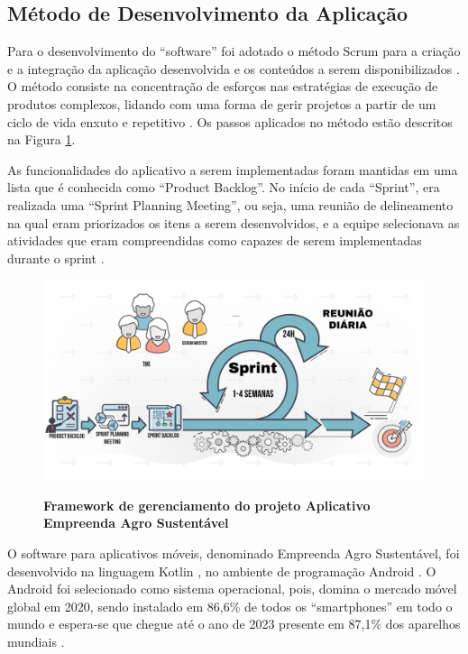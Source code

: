 \subsection{Método de Desenvolvimento da Aplicação}

Para o desenvolvimento do “software” foi adotado o método Scrum para a criação e a integração da aplicação desenvolvida e os conteúdos a serem disponibilizados \cite{schwalbe_scrum_2017}. O método consiste na concentração de esforços nas estratégias de execução de produtos complexos, lidando com uma forma de gerir projetos a partir de um ciclo de vida enxuto e repetitivo \cite{bernardo_framework_2019}. Os passos aplicados no método estão descritos na Figura \ref{figura_47}.

As funcionalidades do aplicativo a serem implementadas foram mantidas em uma lista que é conhecida como “Product Backlog”. No início de cada “Sprint”, era realizada uma “Sprint Planning Meeting”, ou seja, uma reunião de delineamento na qual eram priorizados os itens a serem desenvolvidos, e a equipe selecionava as atividades que eram compreendidas como capazes de serem implementadas durante o sprint \cite{trainning_education_services_curso_2018}.

\begin{figure}[H]
\centering
\caption{\textbf{Framework de gerenciamento do projeto Aplicativo Empreenda Agro Sustentável }}
\includegraphics[scale=0.1]{Imagens/scrum.png}
\label{figura_47}
\end{figure}

O software para aplicativos móveis, denominado Empreenda Agro Sustentável, foi desenvolvido na linguagem Kotlin \cite{smyth_kotlinandroid_2017}, no ambiente de programação Android \cite{android_conheco_2019}. O Android foi selecionado como sistema operacional, pois, domina o mercado móvel global em 2020, sendo instalado em 86,6\% de todos os “smartphones” em todo o mundo e espera-se que chegue até o ano de 2023 presente em 87,1\% dos aparelhos mundiais \cite{idc_idc_2020}.

